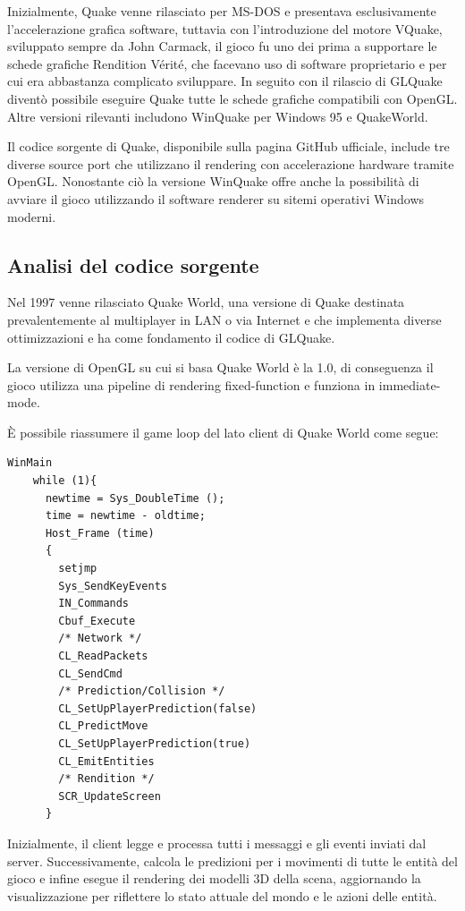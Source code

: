 \documentclass[12pt, letterpaper]{article}
\begin{document}
Inizialmente, Quake venne rilasciato per MS-DOS e presentava esclusivamente l'accelerazione grafica software, tuttavia con l'introduzione del motore VQuake, sviluppato sempre da John Carmack, il gioco fu uno dei prima a supportare le schede grafiche Rendition Vérité, che facevano uso di software proprietario e per cui era abbastanza complicato sviluppare. In seguito con il rilascio di GLQuake diventò possibile eseguire Quake tutte le schede grafiche compatibili con OpenGL. Altre versioni rilevanti includono WinQuake per Windows 95 e QuakeWorld.

Il codice sorgente di Quake, disponibile sulla pagina GitHub ufficiale, include tre diverse source port che utilizzano il rendering con accelerazione hardware tramite OpenGL. Nonostante ciò la versione WinQuake offre anche la possibilità di avviare il gioco utilizzando il software renderer su sitemi operativi Windows moderni. \cite{idsoftware:quake}

\subsection{Analisi del codice sorgente}

Nel 1997 venne rilasciato Quake World, una versione di Quake destinata prevalentemente al multiplayer in LAN o via Internet e che implementa diverse ottimizzazioni e ha come fondamento il codice di GLQuake.

La versione di OpenGL su cui si basa Quake World è la 1.0, di conseguenza il gioco utilizza una pipeline di rendering fixed-function e funziona in immediate-mode.

È possibile riassumere il game loop del lato client di Quake World come segue: 
\newline
\begin{lstlisting}[numbers=none,caption= Riassunto del main loop del client \cite{sanglard2013quake}]
WinMain
    while (1){
      newtime = Sys_DoubleTime ();
      time = newtime - oldtime;
      Host_Frame (time)
      {
        setjmp
        Sys_SendKeyEvents
        IN_Commands
        Cbuf_Execute
        /* Network */
        CL_ReadPackets
        CL_SendCmd
        /* Prediction/Collision */
        CL_SetUpPlayerPrediction(false)
        CL_PredictMove
        CL_SetUpPlayerPrediction(true)
        CL_EmitEntities
        /* Rendition */
        SCR_UpdateScreen
      }
    \end{lstlisting}

    Inizialmente, il client legge e processa tutti i messaggi e gli eventi inviati dal server. Successivamente, calcola le predizioni per i movimenti di tutte le entità del gioco e infine esegue il rendering dei modelli 3D della scena, aggiornando la visualizzazione per riflettere lo stato attuale del mondo e le azioni delle entità.
    
\end{document}
